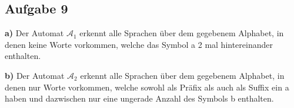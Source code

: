 \documentclass[a4paper,graphics,11pt]{article}
\newcommand{\aufgabe}[1]{\subsection*{Aufgabe #1}}
\begin{document}
\aufgabe{9}

\textbf{a)}
Der Automat $\mathcal{A}_1$ erkennt alle Sprachen über dem gegebenem Alphabet, in denen keine Worte vorkommen,
welche das Symbol a 2 mal hintereinander enthalten.

\textbf{b)}
Der Automat $\mathcal{A}_2$ erkennt alle Sprachen über dem gegebenem Alphabet, in denen nur Worte vorkommen,
welche sowohl als Präfix als auch als Suffix ein a haben und dazwischen nur eine ungerade Anzahl des Symbols b
enthalten.
\end{document}
